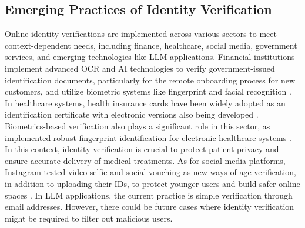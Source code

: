 \subsection{Emerging Practices of Identity Verification}
\vspace{-2mm}
\label{subsec:verification_practice}
Online identity verifications are implemented across various sectors to meet context-dependent needs, including finance, healthcare, social media, government services, and emerging technologies like LLM applications.
Financial institutions implement advanced OCR and AI technologies to verify government-issued identification documents, particularly for the remote onboarding process for new customers, and utilize biometric systems like fingerprint and facial recognition \cite{yousefi2024digital}. In healthcare systems, health insurance cards have been widely adopted as an identification certificate with electronic versions also being developed \cite{chen2012non}. Biometrics-based verification also plays a significant role in this sector, 
as implemented robust fingerprint identification for electronic healthcare systems \cite{fatima2019biometric,jahan2017robust}. In this context, identity verification is crucial to protect patient privacy and ensure accurate delivery of medical treatments. 
As for social media platforms, %
Instagram tested video selfie and social vouching as new ways of age verification, in addition to uploading their IDs, to protect younger users and build safer online spaces \cite{instagramWaysVerify, instagramTypesID, metaTypesID}. %
In LLM applications, the current practice is simple verification through email addresses. However, there could be future cases where identity verification might be required to filter out malicious users.
